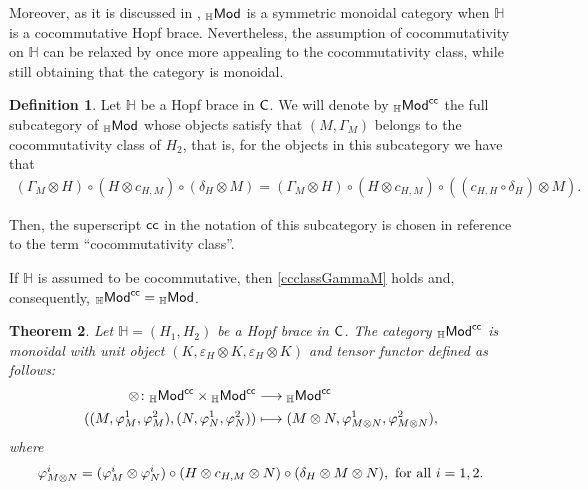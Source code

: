 \documentclass[11pt,reqno]{amsart}
\theoremstyle{plain}%
\newtheorem{theorem}{Theorem}[section]%
\theoremstyle{definition}
\newtheorem{definition}[theorem]{Definition}%
\theoremstyle{remark}
\begin{document}
Moreover, as  it is discussed in \cite[Theorem 2.12]{VGRRProj}, ${}_{\mathbb{H}}{\sf Mod}$ is a symmetric monoidal category when $\mathbb{H}$ is a cocommutative Hopf brace. Nevertheless, the assumption of cocommutativity on $\mathbb{H}$ can be relaxed by once more appealing to the cocommutativity class, while still obtaining that the category is monoidal.
\begin{definition}
	Let $\mathbb{H}$ be a Hopf brace in ${\sf C}$. We will denote by ${}_{\mathbb{H}}{\sf Mod}^{{\sf cc}}$ the full subcategory of ${}_{\mathbb{H}}{\sf Mod}$ whose objects satisfy that $(M,\Gamma_{M})$ belongs to the cocommutativity class of $H_{2}$, that is, for the objects in this subcategory we have that
	\begin{gather}\label{ccclassGammaM}
		(\Gamma_{M}\otimes H)\circ(H\otimes c_{H,M})\circ(\delta_{H}\otimes M)=(\Gamma_{M}\otimes H)\circ(H\otimes c_{H,M})\circ((c_{H,H}\circ\delta_{H})\otimes M).
	\end{gather}
	
	Then, the superscript ${\sf cc}$ in the notation of this subcategory is chosen in reference to the term ``cocommutativity class''. 
	
	If $\mathbb{H}$ is assumed to be cocommutative, then \eqref{ccclassGammaM} holds and, consequently,  ${}_{\mathbb{H}}{\sf Mod}^{{\sf cc}}={}_{\mathbb{H}}{\sf Mod}$.
\end{definition}
\begin{theorem}
	Let $\mathbb{H}=(H_{1},H_{2})$ be a Hopf brace in ${\sf C}$. The category ${}_{\mathbb{H}}{\sf Mod}^{{\sf cc}}$ is monoidal with unit object $(K,\varepsilon_{H}\otimes K,\varepsilon_{H}\otimes K)$ and tensor functor defined as follows:
	\begin{align*}
		\otimes\colon {}_{\mathbb{H}}{\sf Mod}^{{\sf cc}}\times {}_{\mathbb{H}}{\sf Mod}^{{\sf cc}}&\longrightarrow {}_{\mathbb{H}}{\sf Mod}^{{\sf cc}}\\((M,\varphi_{M}^{1},\varphi_{M}^{2}),(N,\varphi_{N}^{1},\varphi_{N}^{2}))&\longmapsto(M\otimes N,\varphi_{M\otimes N}^{1},\varphi_{M\otimes N}^{2}),
	\end{align*}
	where
	\begin{gather}\label{usualtensoraction}
		\varphi_{M\otimes N}^{i}=(\varphi_{M}^{i}\otimes\varphi_{N}^{i})\circ(H\otimes c_{H,M}\otimes N)\circ(\delta_{H}\otimes M\otimes N),\textnormal{ for all }i=1,2.
	\end{gather}
\end{theorem}
\end{document}
